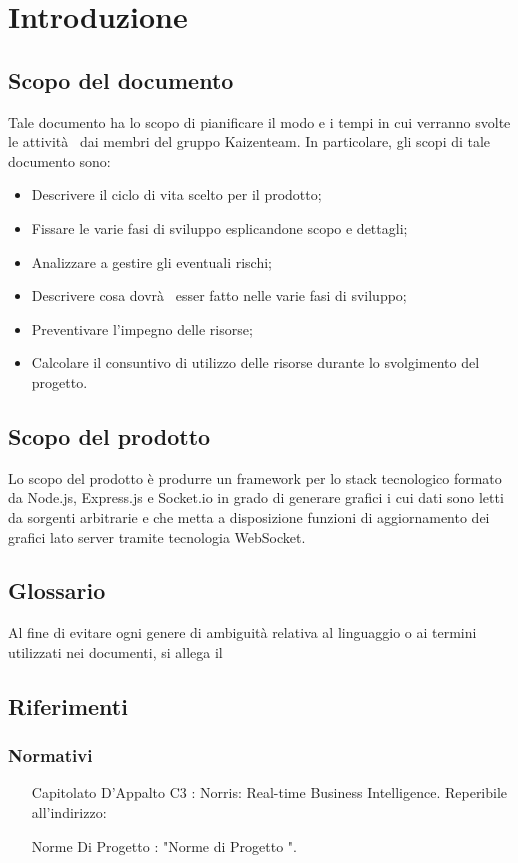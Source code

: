 \section{Introduzione}
	\subsection{Scopo del documento}
		Tale documento ha lo scopo di pianificare il modo e i tempi in cui verranno svolte le attività  dai membri del gruppo Kaizenteam.
		In particolare, gli scopi di tale documento sono:
		\begin{itemize}
			\item Descrivere il ciclo di vita scelto per il prodotto;
			\item Fissare le varie fasi di sviluppo esplicandone scopo e dettagli;
			\item Analizzare a gestire gli eventuali rischi;
			\item Descrivere cosa dovrà  esser fatto nelle varie fasi di sviluppo;
			\item Preventivare l'impegno delle risorse;
			\item Calcolare il consuntivo di utilizzo delle risorse durante lo svolgimento del progetto.
		\end{itemize}
	\subsection{Scopo del prodotto}
		Lo scopo del prodotto è produrre un framework per lo stack tecnologico formato da Node.js, Express.js e Socket.io in grado di generare grafici i cui dati sono letti da sorgenti arbitrarie e che metta a disposizione funzioni di aggiornamento dei grafici lato server tramite tecnologia WebSocket.
	\subsection{Glossario}
		Al fine di evitare ogni genere di ambiguità relativa al linguaggio o ai termini utilizzati nei documenti, si allega il 
	\subsection{Riferimenti}
		\subsubsection{Normativi}
			\begin{itemize}
				\item[Capitolato D'Appalto C3]: Norris: Real-time Business Intelligence. Reperibile all'indirizzo: 
				\item[Norme Di Progetto]: "Norme di Progetto \lastversion".
			\end{itemize}
